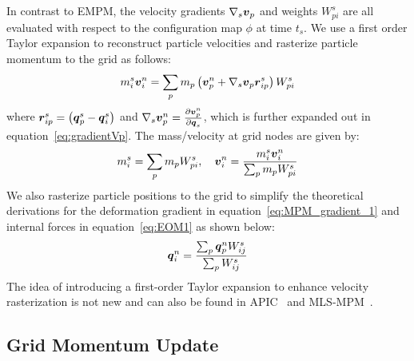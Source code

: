 In contrast to EMPM, the velocity gradients $\nabla_s\boldsymbol{v}_p$ and weights $W_{pi}^s$ are all evaluated with respect to the configuration map $\phi$ at time $t_s$. We use a first order Taylor expansion to reconstruct particle velocities and rasterize particle momentum to the grid as follows:
\begin{equation}
    m_i^s \boldsymbol{v}_i^n=\sum_p m_p \left(\boldsymbol{v}_p^n+ \nabla_s\boldsymbol{v}_p \boldsymbol{r}_{ip}^s\right) W_{pi}^s
\end{equation}
where $\boldsymbol{r}_{ip}^s=\left(\boldsymbol{q}_p^s-\boldsymbol{q}_i^s\right)$ and $\nabla_s \boldsymbol{v}_p^n=\frac{\partial \boldsymbol{v}_p^n}{\partial \boldsymbol{q}_s}$, which is further expanded out in equation~\eqref{eq:gradientVp}.
The mass/velocity at grid nodes are given by:
\begin{equation}
    m_i^s=\sum_p m_p W_{pi}^s,\quad \boldsymbol{v}_i^n= \frac{m_i^s \boldsymbol{v}_i^n} {\sum_p m_p W_{pi}^s}
\end{equation}
We also rasterize particle positions to the grid to simplify the theoretical derivations for the deformation gradient in equation~\eqref{eq:MPM_gradient_1} and internal forces in equation~\eqref{eq:EOM1} as shown below:
\begin{equation}
  \boldsymbol{q}_i^n=\frac{\sum_p\boldsymbol{q}_p^n W_{ij}^s}{\sum_p W_{ij}^s} 
 \label{eq:p2g_position}
\end{equation}
The idea of introducing a first-order Taylor expansion to enhance velocity rasterization is not new and can also be found in APIC~\cite{jiang:2015:apic} and MLS-MPM~\cite{Hu:2018:Moving}. 

\subsection{Grid Momentum Update} 
